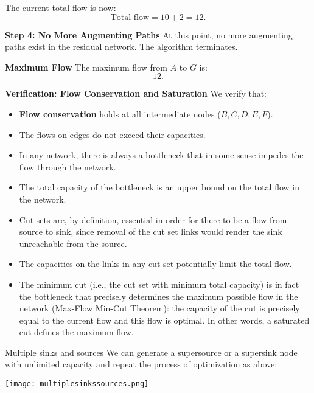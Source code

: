 \documentclass{beamer}
\begin{document}
\begin{frame}[allowframebreaks]
The current total flow is now:
\[
\text{Total flow} = 10 + 2 = 12.
\]

\textbf{Step 4: No More Augmenting Paths}
At this point, no more augmenting paths exist in the residual network. The algorithm terminates.

\textbf{Maximum Flow}
The maximum flow from \( A \) to \( G \) is:
\[
\boxed{12}.
\]

\textbf{Verification: Flow Conservation and Saturation}
We verify that:
\begin{itemize}
    \item \textbf{Flow conservation} holds at all intermediate nodes (\( B, C, D, E, F \)).
    \item The flows on edges do not exceed their capacities.
\end{itemize}


\end{frame}

\begin{frame}
  \begin{itemize}
    \item In any network, there is always a bottleneck that in some sense impedes the flow through the network. 
    \item The total capacity of the bottleneck is an upper bound on the total flow in the network. 
    \item Cut sets are, by definition, essential in order for there to be a flow from source to sink, since removal of the cut set links would render the sink unreachable from the source. 
    \item The capacities on the links in any cut set potentially limit the total flow. 
    \item The minimum cut (i.e., the cut set with minimum total capacity) is in fact the bottleneck that precisely determines the maximum possible flow in the network (Max-Flow Min-Cut Theorem): the capacity of the cut is precisely equal to the current flow and this flow is optimal. In other words, a saturated cut defines the maximum flow.
  \end{itemize}
\end{frame}

\begin{frame}{Multiple sinks and sources}
  We can generate a supersource or  a  supersink node with unlimited capacity and repeat the process of optimization as above:\cite{carter}
  \begin{center}
    \texttt{[image: multiplesinkssources.png]}
  \end{center}
\end{frame}
\end{document}
